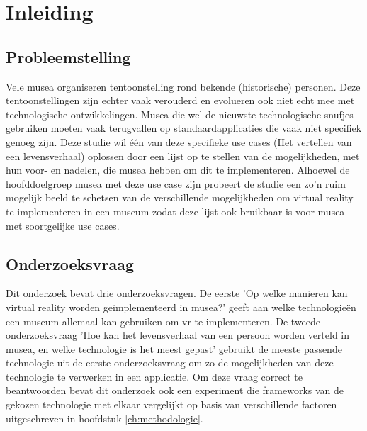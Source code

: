 
\chapter{Inleiding}
\label{ch:inleiding}

\section{Probleemstelling}
\label{sec:probleemstelling}

Vele musea organiseren tentoonstelling rond bekende (historische) personen. Deze tentoonstellingen zijn echter vaak verouderd en evolueren ook niet echt mee met technologische ontwikkelingen. Musea die wel de nieuwste technologische snufjes gebruiken moeten vaak terugvallen op standaardapplicaties die vaak niet specifiek genoeg zijn. Deze studie wil één van deze specifieke use cases (Het vertellen van een levensverhaal) oplossen door een lijst op te stellen van de mogelijkheden, met hun voor- en nadelen, die musea hebben om dit te implementeren. Alhoewel de hoofddoelgroep musea met deze use case zijn probeert de studie een zo'n ruim mogelijk beeld te schetsen van de verschillende mogelijkheden om virtual reality te implementeren in een museum zodat deze lijst ook bruikbaar is voor musea met soortgelijke use cases.

\section{Onderzoeksvraag}
\label{sec:onderzoeksvraag}

Dit onderzoek bevat drie onderzoeksvragen. De eerste 'Op welke manieren kan virtual reality worden geïmplementeerd in musea?' geeft aan welke technologieën een museum allemaal kan gebruiken om \acrshort{vr} te implementeren. De tweede onderzoeksvraag 'Hoe kan het levensverhaal van een persoon worden verteld in musea, en welke technologie is het meest gepast' gebruikt de meeste passende technologie uit de eerste onderzoeksvraag om zo de mogelijkheden van deze technologie te verwerken in een applicatie. Om deze vraag correct te beantwoorden bevat dit onderzoek ook een experiment die frameworks van de gekozen technologie met elkaar vergelijkt op basis van verschillende factoren uitgeschreven in hoofdstuk \ref{ch:methodologie}.

